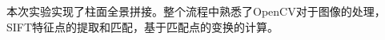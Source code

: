\documentclass{article}
\begin{document}

本次实验实现了柱面全景拼接。整个流程中熟悉了OpenCV对于图像的处理，
SIFT特征点的提取和匹配，基于匹配点的变换的计算。








% 

% 

\end{document}
